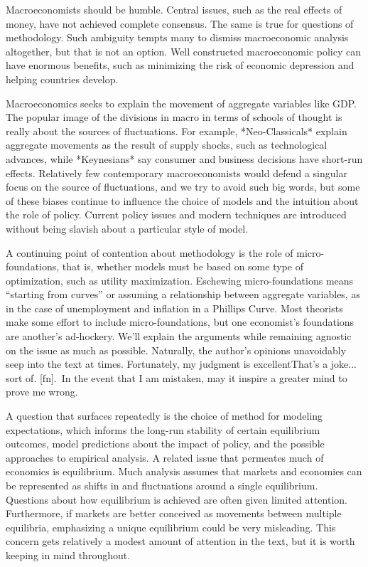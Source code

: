 ﻿\documentclass[oneside]{book}
\begin{document}
Macroeconomists should be humble. Central issues, such as the real effects of money, have not achieved complete consensus. The same is true for questions of methodology. Such ambiguity tempts many to dismiss macroeconomic analysis altogether, but that is not an option. Well constructed
macroeconomic policy can have enormous benefits, such as minimizing the risk of economic depression and helping countries develop.

Macroeconomics seeks to explain the movement of aggregate variables like
GDP. The popular image of the divisions in macro in terms of schools of
thought is really about the sources of fluctuations. For example,
*Neo-Classicals* explain aggregate movements as the result of supply shocks, such as technological advances, while *Keynesians* say consumer and business decisions have short-run effects. Relatively few contemporary macroeconomists would defend a singular focus on the source of fluctuations, and we try to avoid such big words, but some of these biases continue to influence the choice of models and the intuition about the role of policy. Current policy issues and modern techniques are introduced without being slavish about a particular style of model.

A continuing point of contention about methodology is the role of
micro-foundations, that is, whether models must be based on some type of optimization, such as utility maximization. Eschewing micro-foundations means ``starting from curves'' or assuming a relationship between aggregate variables, as in the case of unemployment and inflation in a Phillips Curve. Most theorists make some effort to include micro-foundations, but one economist's foundations are another's ad-hockery. We'll explain the arguments while remaining agnostic on the issue as much as possible. Naturally, the author's opinions unavoidably seep into the text at times. Fortunately, my judgment is excellentThat's a joke... sort of. [fn].\ In the event that I am mistaken, may it inspire a greater mind to prove me wrong.

A question that surfaces repeatedly is the choice of method for modeling
expectations, which informs the long-run stability of certain equilibrium
outcomes, model predictions about the impact of policy, and the possible
approaches to empirical analysis. A related issue that permeates much
of economics is equilibrium. Much analysis assumes that markets and
economies can be represented as shifts in and fluctuations around a single
equilibrium. Questions about how equilibrium is achieved are often given
limited attention. Furthermore, if markets are better conceived as
movements between multiple equilibria, emphasizing a unique equilibrium
could be very misleading. This concern gets relatively a modest amount of
attention in the text, but it is worth keeping in mind throughout.
\end{document}
